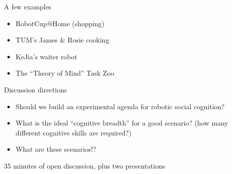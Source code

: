 \documentclass[compress]{beamer}
\begin{document}
\begin{frame}{A few examples}
    \small
    \begin{multicols}{2}
    \begin{itemize}
        \item<1-> RobotCup@Home (shopping)
        \item<2-> TUM's James \& Rosie cooking \vfill\columnbreak
        \item<3-> KeJia's waiter robot
        \item<4-> The ``Theory of Mind'' Task Zoo
    \end{itemize}
    \end{multicols}

    \centering
\end{frame}

\begin{frame}{Discussion directions}

    \begin{itemize}
        \item Should we build an experimental agenda for robotic social cognition?
        \item What is the ideal ``cognitive breadth'' for a good scenario? (how many
            different cognitive skills are required?)
        \item What are these scenarios!?
    \end{itemize}

    35 minutes of open discussion, plus two presentations

\end{frame}

%
%
%
%
%
%
%
%
%
\end{document}
